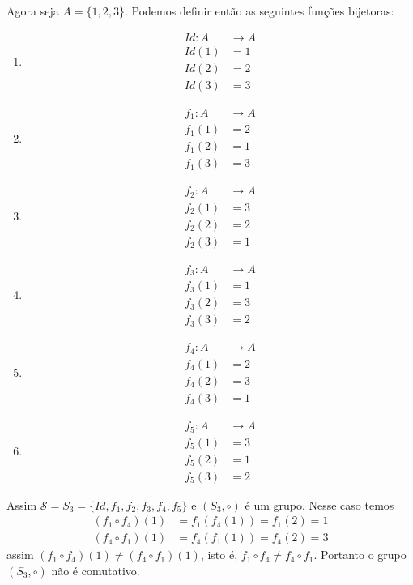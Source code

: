 Agora seja $A = \{1, 2, 3\}$. Podemos definir então as seguintes funções bijetoras:
\begin{multicols}{3}
	\begin{enumerate}
		\item[] \begin{align*}
			Id : A &\to A\\
			Id(1) &= 1\\
			Id(2) &= 2\\
			Id(3) &= 3
		\end{align*}
		\item[] \begin{align*}
			f_1 : A &\to A\\
			f_1(1) &= 2\\
			f_1(2) &= 1\\
			f_1(3) &= 3
		\end{align*}
		\item[] \begin{align*}
			f_2 : A &\to A\\
			f_2(1) &= 3\\
			f_2(2) &= 2\\
			f_2(3) &= 1
		\end{align*}
		\item[] \begin{align*}
			f_3 : A &\to A\\
			f_3(1) &= 1\\
			f_3(2) &= 3\\
			f_3(3) &= 2
		\end{align*}
		\item[] \begin{align*}
			f_4 : A &\to A\\
			f_4(1) &= 2\\
			f_4(2) &= 3\\
			f_4(3) &= 1
		\end{align*}
		\item[] \begin{align*}
			f_5 : A &\to A\\
			f_5(1) &= 3\\
			f_5(2) &= 1\\
			f_5(3) &= 2
		\end{align*}
	\end{enumerate}
\end{multicols}

Assim $\mathcal{S} = S_3 = \{Id, f_1, f_2, f_3, f_4, f_5\}$ e $(S_3, \circ)$ é um grupo. Nesse caso temos
\begin{align*}
	(f_1 \circ f_4)(1) &= f_1(f_4(1)) = f_1(2) = 1\\
	(f_4 \circ f_1)(1) &= f_4(f_1(1)) = f_4(2) = 3
\end{align*}
assim $(f_1 \circ f_4)(1) \ne (f_4 \circ f_1)(1)$, isto é, $f_1 \circ f_4 \ne f_4 \circ f_1$. Portanto o grupo $(S_3, \circ)$ não é comutativo.


